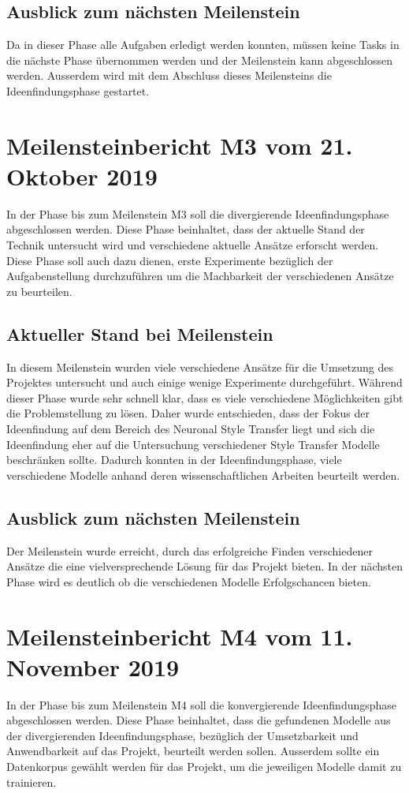 \subsection{Ausblick zum nächsten Meilenstein}
Da in dieser Phase alle Aufgaben erledigt werden konnten, müssen keine Tasks in die nächste Phase übernommen werden und
der Meilenstein kann abgeschlossen werden. Ausserdem wird mit dem Abschluss dieses Meilensteins die Ideenfindungsphase
gestartet.

\section{Meilensteinbericht M3 vom 21. Oktober 2019}
In der Phase bis zum Meilenstein M3 soll die divergierende Ideenfindungsphase abgeschlossen werden. Diese Phase
beinhaltet, dass der aktuelle Stand der Technik untersucht wird und verschiedene aktuelle Ansätze erforscht werden.
Diese Phase soll auch dazu dienen, erste Experimente bezüglich der Aufgabenstellung durchzuführen um die Machbarkeit der
verschiedenen Ansätze zu beurteilen.

\subsection{Aktueller Stand bei Meilenstein}
In diesem Meilenstein wurden viele verschiedene Ansätze für die Umsetzung des Projektes untersucht und auch einige
wenige Experimente durchgeführt. Während dieser Phase wurde sehr schnell klar, dass es viele verschiedene Möglichkeiten
gibt die Problemstellung zu lösen. Daher wurde entschieden, dass der Fokus der Ideenfindung auf dem Bereich des Neuronal
Style Transfer liegt und sich die Ideenfindung eher auf die Untersuchung verschiedener Style Transfer Modelle
beschränken sollte. Dadurch konnten in der Ideenfindungsphase, viele verschiedene Modelle anhand deren
wissenschaftlichen Arbeiten beurteilt werden.

\subsection{Ausblick zum nächsten Meilenstein}
Der Meilenstein wurde erreicht, durch das erfolgreiche Finden verschiedener Ansätze die eine vielversprechende Lösung
für das Projekt bieten. In der nächsten Phase wird es deutlich ob die verschiedenen Modelle Erfolgschancen bieten.

\section{Meilensteinbericht M4 vom 11. November 2019}
In der Phase bis zum Meilenstein M4 soll die konvergierende Ideenfindungsphase abgeschlossen werden. Diese Phase
beinhaltet, dass die gefundenen Modelle aus der divergierenden Ideenfindungsphase, bezüglich der Umsetzbarkeit und
Anwendbarkeit auf das Projekt, beurteilt werden sollen. Ausserdem sollte ein Datenkorpus gewählt werden für das Projekt,
um die jeweiligen Modelle damit zu trainieren.

